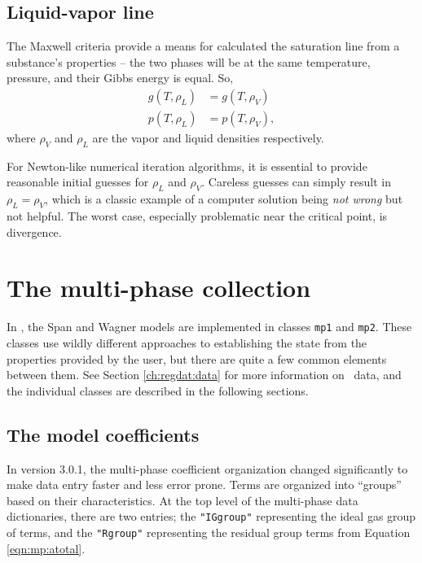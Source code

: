 \subsection{Liquid-vapor line}

The Maxwell criteria provide a means for calculated the saturation line from a substance's properties -- the two phases will be at the same temperature, pressure, and their Gibbs energy is equal.  So,
\begin{subequations}
\begin{align}
g(T,\rho_L) &= g(T,\rho_V)\label{eqn:mp:maxwellg}\\
p(T,\rho_L) &= p(T,\rho_V)\label{eqn:mp:maxwellp},
\end{align}
\end{subequations}
where $\rho_V$ and $\rho_L$ are the vapor and liquid densities respectively.

For Newton-like numerical iteration algorithms, it is essential to provide reasonable initial guesses for $\rho_L$ and $\rho_V$.  Careless guesses can simply result in $\rho_L = \rho_V$, which is a classic example of a computer solution being \emph{not wrong} but not helpful.  The worst case, especially problematic near the critical point, is divergence.


\section{The multi-phase collection}

In \PM, the Span and Wagner models are implemented in classes \texttt{mp1} and \texttt{mp2}.  These classes use wildly different approaches to establishing the state from the properties provided by the user, but there are quite a few common elements between them.  See Section \ref{ch:regdat:data} for more information on \PM\ data, and the individual classes are described in the following sections.

\subsection{The model coefficients}

In version 3.0.1, the multi-phase coefficient organization changed significantly to make data entry faster and less error prone.  Terms are organized into ``groups'' based on their characteristics.  At the top level of the multi-phase data dictionaries, there are two entries; the \texttt{"IGgroup"} representing the ideal gas group of terms, and the \texttt{"Rgroup"} representing the residual group terms from Equation \ref{eqn:mp:atotal}.


